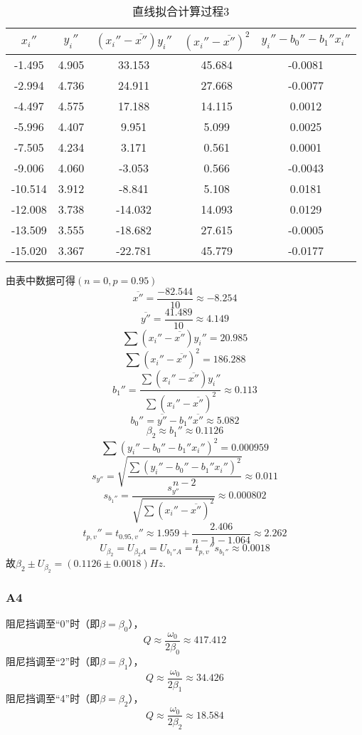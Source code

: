 \documentclass[12pt,a4paper,oneside,left=3.18,right=3.18,top=2.54,bottom=2.54]{ctexart}
\begin{document}
			\begin{table}[H]
			\centering
			\begin{tabular}{|c|c|c|c||c|}
			\hline
			$x_i''$&$y_i''$&$(x_i''-\overline{x''})y_i''$&$(x_i''-\overline{x''})^2$&$y_i''-b_0''-b_1''x_i''$\\
			\hline
			-1.495&4.905&33.153&45.684&-0.0081\\
			\hline
			-2.994&4.736&24.911&27.668&-0.0077\\
			\hline
			-4.497&4.575&17.188&14.115&0.0012\\
			\hline
			-5.996&4.407&9.951&5.099&0.0025\\
			\hline
			-7.505&4.234&3.171&0.561&0.0001\\
			\hline
			-9.006&4.060&-3.053&0.566&-0.0043\\
			\hline
			-10.514&3.912&-8.841&5.108&0.0181\\
			\hline
			-12.008&3.738&-14.032&14.093&0.0129\\
			\hline
			-13.509&3.555&-18.682&27.615&-0.0005\\
			\hline
			-15.020&3.367&-22.781&45.779&-0.0177\\
			\hline
			\end{tabular}
			\caption{直线拟合计算过程3}
			\end{table}
			由表中数据可得$(n=0,p=0.95)$
			$$\overline{x''}=\dfrac{-82.544}{10}\approx-8.254$$
			$$\overline{y''}=\dfrac{41.489}{10}\approx4.149$$
			$$\sum{(x_i''-\overline{x''})y_i''}=20.985$$
			$$\sum{(x_i''-\overline{x''})^2}=186.288$$
			$$b_1''=\dfrac{\sum{(x_i''-\overline{x''})y_i''}}{\sum{(x_i''-\overline{x''})^2}}\approx0.113$$
			$$b_0''=\overline{y''}-b_1''\overline{x''}\approx5.082$$
			$$\beta_2\approx b_1''\approx0.1126$$
			$$\sum{(y_i''-b_0''-b_1''x_i'')^2}=0.000959$$
			$$s_{y''}=\sqrt{\dfrac{\sum{(y_i''-b_0''-b_1''x_i'')^2}}{n-2}}\approx0.011$$
			$$s_{b_1''}=\dfrac{s_{y''}}{\sqrt{\sum{(x_i''-\overline{x''})^2}}}\approx0.000802$$
			$$t_{p,v}''=t_{0.95,v}''\approx1.959+\dfrac{2.406}{n-1-1.064}\approx2.262$$
			$$U_{\beta_2}=U_{\beta_2A}=U_{b_1''A}=t_{p,v}''s_{b_1''}\approx0.0018$$
			故$\beta_2\pm U_{\beta_2}=(0.1126\pm0.0018)Hz$.
		\subsubsection{A4}
			\label{p4}
			阻尼挡调至“0”时（即$\beta=\beta_0$），
			$$Q\approx\dfrac{\omega_0}{2\beta_0}\approx417.412$$
			\indent
			阻尼挡调至“2”时（即$\beta=\beta_1$），
			$$Q\approx\dfrac{\omega_0}{2\beta_1}\approx34.426$$
			\indent
			阻尼挡调至“4”时（即$\beta=\beta_2$），
			$$Q\approx\dfrac{\omega_0}{2\beta_2}\approx18.584$$
\end{document}
